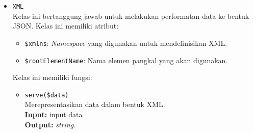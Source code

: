 \begin{itemize}
        \item \texttt{XML} \\
            Kelas ini bertanggung jawab untuk melakukan performatan data ke
            bentuk JSON. Kelas ini memiliki atribut:
            \begin{itemize}
                \item \texttt{\$xmlns}: \textit{Namespace} yang digunakan untuk
                mendefinisikan XML.
                \item \texttt{\$rootElementName}: Nama elemen pangkal yang akan
                digunakan.
            \end{itemize}
            Kelas ini memiliki fungsi:
            \begin{itemize}
                \item \texttt{serve(\$data)} \\
                    Merepresentasikan data dalam bentuk XML.\\
                    \textbf{Input:} input data\\
                    \textbf{Output:} \textit{string}.
            \end{itemize}
    \end{itemize}
    
